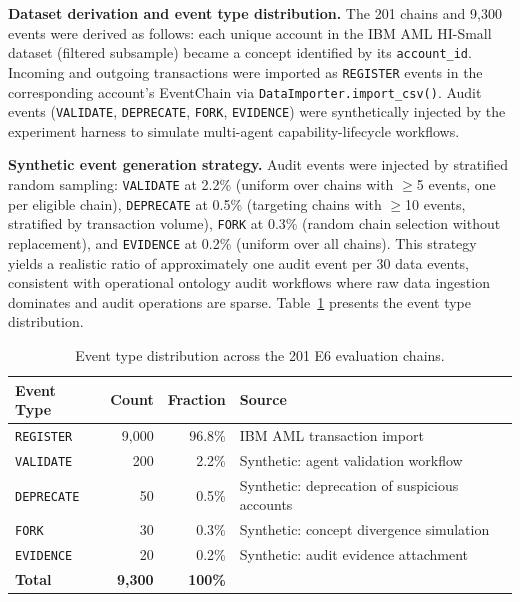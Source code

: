 \textbf{Dataset derivation and event type distribution.} The 201 chains and 9,300 events were derived as follows: each unique account in the IBM AML HI-Small dataset (filtered subsample) became a concept identified by its \texttt{account\_id}. Incoming and outgoing transactions were imported as \texttt{REGISTER} events in the corresponding account's EventChain via \texttt{DataImporter.import\_csv()}. Audit events (\texttt{VALIDATE}, \texttt{DEPRECATE}, \texttt{FORK}, \texttt{EVIDENCE}) were synthetically injected by the experiment harness to simulate multi-agent capability-lifecycle workflows.

\textbf{Synthetic event generation strategy.} Audit events were injected by stratified random sampling: \texttt{VALIDATE} at 2.2\% (uniform over chains with $\geq$5 events, one per eligible chain), \texttt{DEPRECATE} at 0.5\% (targeting chains with $\geq$10 events, stratified by transaction volume), \texttt{FORK} at 0.3\% (random chain selection without replacement), and \texttt{EVIDENCE} at 0.2\% (uniform over all chains). This strategy yields a realistic ratio of approximately one audit event per 30 data events, consistent with operational ontology audit workflows where raw data ingestion dominates and audit operations are sparse. Table~\ref{tab:event-distribution-full} presents the event type distribution.

\begin{table}[htbp]
\centering
\caption{Event type distribution across the 201 E6 evaluation chains.}
\label{tab:event-distribution-full}
\begin{tabular}{@{}lrrl@{}}
\toprule
\textbf{Event Type} & \textbf{Count} & \textbf{Fraction} & \textbf{Source} \\
\midrule
\texttt{REGISTER} & 9{,}000 & 96.8\% & IBM AML transaction import \\
\texttt{VALIDATE} & 200 & 2.2\% & Synthetic: agent validation workflow \\
\texttt{DEPRECATE} & 50 & 0.5\% & Synthetic: deprecation of suspicious accounts \\
\texttt{FORK} & 30 & 0.3\% & Synthetic: concept divergence simulation \\
\texttt{EVIDENCE} & 20 & 0.2\% & Synthetic: audit evidence attachment \\
\midrule
\textbf{Total} & \textbf{9{,}300} & \textbf{100\%} & \\
\bottomrule
\end{tabular}
\end{table}

